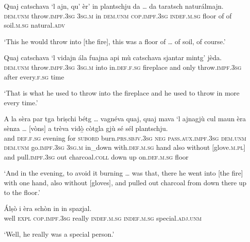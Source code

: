 \begin{linenumbers}
\gll Quaj catschava `l ajn, qu’ èr’ in plantschju da … da taratsch naturálmajn.\\
 \textsc{dem.unm} throw.\textsc{impf.3sg} \textsc{3sg.m} in \textsc{dem.unm} \textsc{cop.impf.3sg} \textsc{indef.m.sg} floor of {} of soil.\textsc{m.sg} natural.\textsc{adv}\\
\end{linenumbers}
\medskip
\glt `This he would throw into [the fire], this was a floor of … of soil, of course.'
\medskip

\begin{linenumbers}
\gll Quaj catschava `l vidajn ála fuajna api mù catschava sjantar mintg’ jèda.\\
 \textsc{dem.unm} throw.\textsc{impf.3sg} \textsc{3sg.m} into in.\textsc{def.f.sg} fireplace and only throw.\textsc{impf.3sg} after every.\textsc{f.sg} time\\
\end{linenumbers}
\medskip
\glt `That is what he used to throw into the fireplace and he used to throw in more every time.'
\medskip
 
\begin{linenumbers}
\gll  A la sèra par tga briṣchi bétg … vagnéva quaj, quaj mava `l ajnagjù cul maun èra sènza … [vòns] a trèva vidò̱ còtgla gjù sé sél plantschju.  \\
and \textsc{def.f.sg} evening  for \textsc{subord} burn.\textsc{prs.sbjv.3sg} \textsc{neg} {} \textsc{pass.aux.impf.3sg} \textsc{dem.unm} \textsc{dem.unm} go.\textsc{impf.3sg} \textsc{3sg.m} in\_down with.\textsc{def.m.sg} hand also without {} [glove.\textsc{m.pl}] and pull.\textsc{impf.3sg} out charcoal.\textsc{coll} down up on.\textsc{def.m.sg} floor  \\
\end{linenumbers}
\medskip
\glt `And in the evening, to avoid it burning … was that, there he went into [the fire] with one hand, also without [gloves], and pulled out charcoal from down there up to the floor.'
\medskip

\begin{linenumbers}
\gll Álṣò i èra schòn in in spazjal.    \\
well \textsc{expl} \textsc{cop.impf.3sg} really \textsc{indef.m.sg} \textsc{indef.m.sg} special.\textsc{adj.unm} \\
\end{linenumbers}
\medskip
\glt `Well, he really was a special person.'
\medskip 

